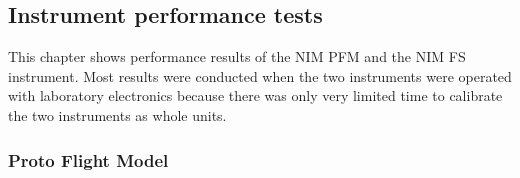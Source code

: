 		
	\subsection{Instrument performance tests}
		This chapter shows performance results of the NIM PFM and the NIM FS instrument. Most results were conducted when the two instruments were operated with laboratory electronics because there was only very limited time to calibrate the two instruments as whole units.
		
		\subsubsection{Proto Flight Model}\label{sec:paper}
		
		\newpage
		
